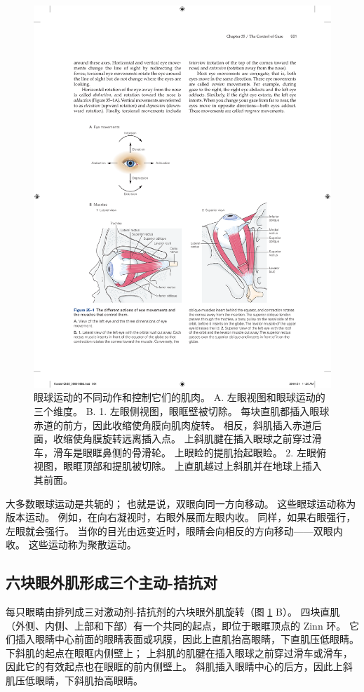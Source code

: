 \begin{figure}[htbp]
	\centering
	\includegraphics[width=0.85\linewidth]{chap35/fig_35_1}
	\caption{眼球运动的不同动作和控制它们的肌肉。 A. 左眼视图和眼球运动的三个维度。 B. 1. 左眼侧视图，眼眶壁被切除。 每块直肌都插入眼球赤道的前方，因此收缩使角膜向肌肉旋转。 相反，斜肌插入赤道后面，收缩使角膜旋转远离插入点。 上斜肌腱在插入眼球之前穿过滑车，滑车是眼眶鼻侧的骨滑轮。 上眼睑的提肌抬起眼睑。 2. 左眼俯视图，眼眶顶部和提肌被切除。 上直肌越过上斜肌并在地球上插入其前面。}
	\label{fig:35_1}
\end{figure}

大多数眼球运动是共轭的； 也就是说，双眼向同一方向移动。 这些眼球运动称为版本运动。 例如，在向右凝视时，右眼外展而左眼内收。 同样，如果右眼强行，左眼就会强行。 当你的目光由远变近时，眼睛会向相反的方向移动——双眼内收。 这些运动称为聚散运动。

\subsection{六块眼外肌形成三个主动-拮抗对}
每只眼睛由排列成三对激动剂-拮抗剂的六块眼外肌旋转（图 \ref{fig:35_1} B）。 四块直肌（外侧、内侧、上部和下部）有一个共同的起点，即位于眼眶顶点的 Zinn 环。 它们插入眼睛中心前面的眼睛表面或巩膜，因此上直肌抬高眼睛，下直肌压低眼睛。 下斜肌的起点在眼眶内侧壁上； 上斜肌的肌腱在插入眼球之前穿过滑车或滑车，因此它的有效起点也在眼眶的前内侧壁上。 斜肌插入眼睛中心的后方，因此上斜肌压低眼睛，下斜肌抬高眼睛。

